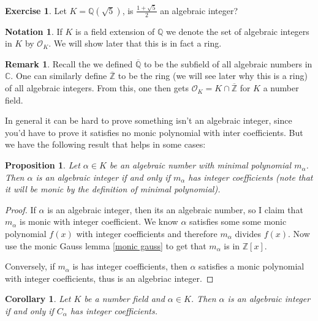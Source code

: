 \documentclass[11pt,a4paper]{report}
\theoremstyle{plain}
\newtheorem{corollary}[subsection]{Corollary}
\newtheorem{prop}[subsection]{Proposition}
\theoremstyle{definition}
\theoremstyle{definition}
\newtheorem{rmrk}[subsection]{Remark}
\newtheorem{nota}[subsection]{Notation}
\newtheorem{question}[subsection]{Exercise}
\newcommand{\ZZ}{\mathbb{Z}}
\def\CC{\mathbb{C}}
\def\QQ{\mathbb{Q}}
\def \a{\alpha}
\def \OO {\mathcal{O}}
\def \ov{\overline}
\begin{document}
	\begin{question}
		Let $K=\QQ(\sqrt{5})$, is $\frac{1+\sqrt{5}}{2}$ an algebraic integer?
	\end{question}
	
	\begin{nota}
		If $K$ is a field extension of $\QQ$ we denote the set of algebraic integers in $K$ by $\OO_K$. We will show later that this is in fact a ring. 
	\end{nota}
	
	\begin{rmrk}\label{rmrk: all alg ints}
		Recall the we defined $\ov{\QQ}$ to be the subfield of all algebraic numbers in $\CC$. One can similarly define $\ov{\ZZ}$ to be the ring (we will see later why this is a ring) of all algebraic integers. From this, one then gets $\OO_K=K \cap \ov{\ZZ}$ for $K$ a number field.
	\end{rmrk}
	
	In general it can be hard to prove something isn't an algebraic integer, since you'd have to prove it satisfies no monic polynomial with inter coefficients. But we have the following result that helps in some cases:
	
	\begin{prop}\label{prop: min pol alg int}
		Let $\a \in K$ be an algebraic number with minimal polynomial $m_\a$. Then $\a$ is an algebraic integer if and only if $m_{\a}$ has integer coefficients (note that it will be monic by the definition of minimal polynomial).
	\end{prop}
	
	\begin{proof}
		If $\a$ is an algebraic integer, then its an algebraic number, so I claim that $m_\a$ is monic with integer coefficient. We know $\a$ satisfies some some monic polynomial $f(x)$ with integer coefficients and therefore $m_\a$ divides $f(x)$. Now use the monic Gauss lemma \ref{monic gauss} to get that $m_\a$ is in $\ZZ[x]$.
		
		
		
		Conversely, if $m_\a$ is has integer coefficients, then $\a$ satisfies a monic polynomial with integer coefficients, thus is an algebriac integer.
	\end{proof}
	
	
	\begin{corollary}\label{cor: field pol of alg int has int coefs}
		Let $K$ be a number field and $\a \in K$. Then $\a$ is an algebraic integer if and only if $C_\a$ has integer coefficients.
	\end{corollary}
	
\end{document}
